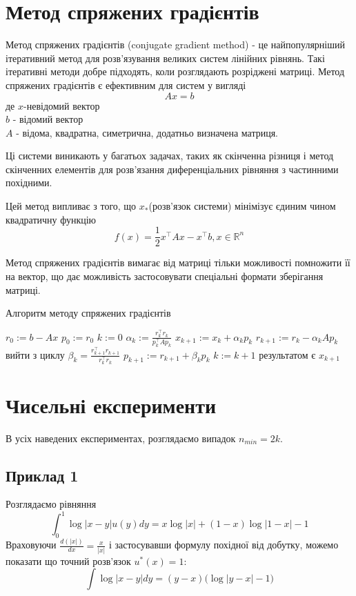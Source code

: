 \documentclass[12pt]{report}
\begin{document}
	\section{Метод спряжених градієнтів}
	\hspace{0.8cm} Метод спряжених градієнтів (conjugate gradient method) - це найпопулярніший ітеративний метод для розв'язування великих систем лінійних рівнянь. Такі ітеративні методи добре підходять, коли розглядають розріджені матриці. Метод спряжених градієнтів є ефективним для систем у вигляді $$Ax=b$$
	де $x$-невідомий вектор\\
	$b$ - відомий вектор\\
	$A$ - відома, квадратна, симетрична, додатньо визначена матриця.\par Ці системи виникають у багатьох задачах, таких як скінченна різниця і метод скінченних елементів для розв'язання диференціальних рівняння з частинними похідними.
	\par Цей метод випливає з того, що $x_{*}$(розв'язок системи) мінімізує єдиним чином квадратичну функцію
	$$f(x)=\frac{1}{2}x^\top Ax-x^\top b, x\in\mathbb{R}^n$$
	\par Метод спряжених градієнтів вимагає від матриці тільки можливості помножити її на вектор, що дає можливість застосовувати спеціальні формати зберігання матриці.
	\begin{algorithm}
	\caption{Алгоритм методу спряжених градієнтів}
	\begin{algorithmic}
		\STATE $r_0:=b-Ax$
		\STATE $p_0:=r_0$
		\STATE $k:=0$
			\STATE $\alpha_k:=\frac{r_k^{\intercal}r_k}{p_k^{\intercal}Ap_k}$
			\STATE $x_{k+1}:=x_k+\alpha_kp_k$
			\STATE $r_{k+1}:=r_k-\alpha_kAp_k$
				\STATE вийти з циклу
			\ENDIF
			\STATE $\beta_k=\frac{r_{k+1}^{\intercal}r_{k+1}}{r_k^\intercal r_k}$
			\STATE $p_{k+1}:=r_{k+1}+\beta_kp_k$
			\STATE $k:=k+1$
		\ENDWHILE
		\STATE результатом є $x_{k+1}$
	\end{algorithmic}
	
	\end{algorithm}
	\section{Чисельні експерименти}
	\hspace{0.8cm}В усіх наведених експериментах, розглядаємо випадок $n_{min}=2k$.
	\subsection{Приклад 1}
	\hspace{0.8cm}Розглядаємо рівняння
	$$\int_{0}^{1}\log|x-y|u(y)dy = x\log|x|+(1-x)\log|1-x|-1$$
	Враховуючи $\frac{d(|x|)}{dx}=\frac{x}{|x|}$ і застосувавши формулу похідної від добутку, можемо показати що точний розв'язок $u^{*}(x)=1$:
	$$\int \log|x-y|dy=(y-x)\big(\log|y-x|-1\big)$$
\end{document}
